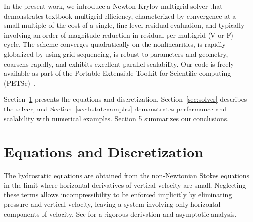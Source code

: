 In the present work, we introduce a Newton-Krylov multigrid solver that demonstrates textbook
multigrid efficiency, characterized by convergence at a small multiple of the cost of a single,
fine-level residual evaluation, and typically involving an order of magnitude reduction in residual
per multigrid (V or F) cycle.  The scheme converges quadratically on the nonlinearities, is rapidly
globalized by using grid sequencing, is robust to parameters and geometry, coarsens rapidly,
and exhibits excellent parallel scalability.  Our code is freely available as part
of the Portable Extensible Toolkit for Scientific computing (PETSc)~\citep{petsc-web-page,petsc-user-ref}.

Section~\ref{sec:equations} presents the equations and discretization, Section~\ref{sec:solver} describes the solver, and Section~\ref{sec:hstatexamples} demonstrates performance and scalability with numerical examples. Section 5 summarizes our conclusions.

\section{Equations and Discretization}\label{sec:equations}
The hydrostatic equations are obtained from the non-Newtonian Stokes equations in the limit where
horizontal derivatives of vertical velocity are small.  Neglecting these terms allows
incompressibility to be enforced implicitly by eliminating pressure and vertical velocity, leaving a
system involving only horizontal components of velocity.  See \citet{schoof2010thin} for a rigorous
derivation and asymptotic analysis.

